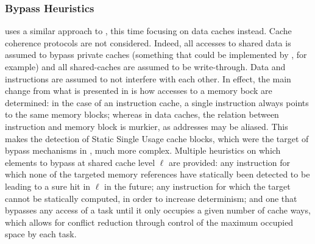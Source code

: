 \subsubsection{Bypass Heuristics}
\cite{lesage:inria-00531214} uses a similar approach to
\cite{10.1109/RTSS.2009.34}, this time focusing on data caches instead. Cache
coherence protocols are not considered. Indeed, all accesses to shared data is
assumed to bypass private caches (something that could be implemented by
\cite{bansal2019cache}, for example) and all shared-caches are assumed
to be write-through. Data and instructions are assumed to not interfere with
each other. In effect, the main change from what is presented in
\cite{10.1109/RTSS.2009.34} is how accesses to a memory bock are determined:
in the case of an instruction cache, a single instruction always points to
the same memory blocks; whereas in data caches, the relation between instruction
and memory block is murkier, as addresses may be aliased. This makes the
detection of Static Single Usage cache blocks, which were the target of bypass
mechanisms in \cite{10.1109/RTSS.2009.34}, much more complex. Multiple
heuristics on which elements to bypass at shared cache level $\ell$ are
provided: any instruction for which none of the targeted memory references have
statically been detected to be leading to a sure hit in $\ell$ in the future;
any instruction for which the target cannot be statically computed, in order to
increase determinism; and one that bypasses any access of a task until it only
occupies a given number of cache ways, which allows for conflict reduction
through control of the maximum occupied space by each task.
